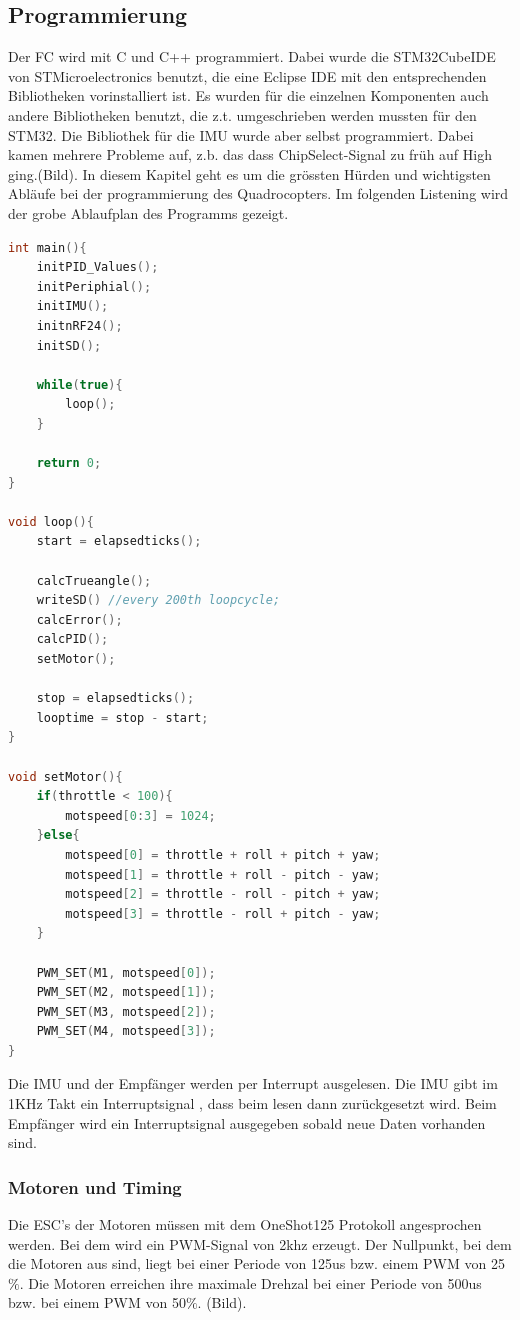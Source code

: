 \documentclass[12pt,a4paper, ngerman]{article}
\begin{document}
\subsection{Programmierung}
Der FC wird mit C und C++ programmiert. Dabei wurde die STM32CubeIDE von STMicroelectronics benutzt, die eine Eclipse IDE mit den entsprechenden Bibliotheken vorinstalliert ist. Es wurden für die einzelnen Komponenten auch andere Bibliotheken benutzt, die z.t. umgeschrieben werden mussten für den STM32. Die Bibliothek für die IMU wurde aber selbst programmiert. Dabei kamen mehrere Probleme auf, z.b. das dass ChipSelect-Signal zu früh auf High ging.(Bild). In diesem Kapitel geht es um die grössten Hürden und wichtigsten Abläufe bei der programmierung des Quadrocopters. Im folgenden Listening wird der grobe Ablaufplan des Programms gezeigt.

\begin{lstlisting}[language=C++,caption=Programmablauf Pseudocode]
int main(){
	initPID_Values();
	initPeriphial();
	initIMU();
	initnRF24();
	initSD();
	
	while(true){
		loop();
	}
	
	return 0;
}

void loop(){
	start = elapsedticks();
	
	calcTrueangle();
	writeSD() //every 200th loopcycle;
	calcError();
	calcPID();
	setMotor();
	
	stop = elapsedticks();
	looptime = stop - start;
}

void setMotor(){
	if(throttle < 100){
		motspeed[0:3] = 1024;	
	}else{
		motspeed[0] = throttle + roll + pitch + yaw; 
		motspeed[1]	= throttle + roll - pitch - yaw;
		motspeed[2]	= throttle - roll - pitch + yaw;
		motspeed[3]	= throttle - roll + pitch - yaw;
	}
	
	PWM_SET(M1, motspeed[0]);
	PWM_SET(M2, motspeed[1]);
	PWM_SET(M3, motspeed[2]);
	PWM_SET(M4, motspeed[3]);
}
\end{lstlisting}

Die IMU und der Empfänger werden per Interrupt ausgelesen. Die  IMU gibt im 1KHz Takt ein Interruptsignal , dass beim lesen dann zurückgesetzt wird. Beim Empfänger wird ein Interruptsignal ausgegeben sobald neue Daten vorhanden sind.

\subsubsection{Motoren und Timing}
Die ESC's der Motoren müssen mit dem OneShot125 Protokoll\cite{website:OL_OneShot125} angesprochen werden. Bei dem wird ein PWM-Signal von 2khz erzeugt. Der Nullpunkt, bei dem die Motoren aus sind, liegt bei einer Periode von 125us bzw. einem PWM von 25$\%$. Die Motoren erreichen ihre maximale Drehzal bei einer Periode von 500us bzw. bei einem PWM von 50$\%$. (Bild).
\end{document}
